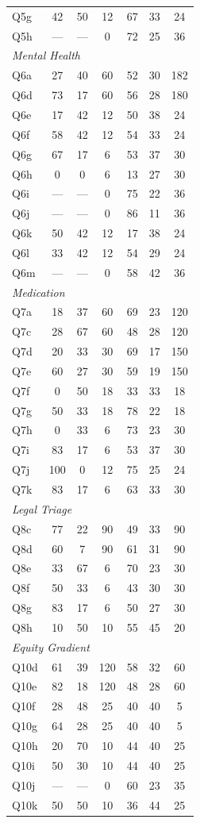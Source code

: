 \begin{table}[htbp]
\begin{tabular}{l|ccc|ccc}
Q5g & 42 & 50 & 12 & 67 & 33 & 24 \\
Q5h & --- & --- & 0 & 72 & 25 & 36 \\
\midrule
\multicolumn{7}{l}{\textit{Mental Health}} \\
Q6a & 27 & 40 & 60 & 52 & 30 & 182 \\
Q6d & 73 & 17 & 60 & 56 & 28 & 180 \\
Q6e & 17 & 42 & 12 & 50 & 38 & 24 \\
Q6f & 58 & 42 & 12 & 54 & 33 & 24 \\
Q6g & 67 & 17 & 6 & 53 & 37 & 30 \\
Q6h & 0 & 0 & 6 & 13 & 27 & 30 \\
Q6i & --- & --- & 0 & 75 & 22 & 36 \\
Q6j & --- & --- & 0 & 86 & 11 & 36 \\
Q6k & 50 & 42 & 12 & 17 & 38 & 24 \\
Q6l & 33 & 42 & 12 & 54 & 29 & 24 \\
Q6m & --- & --- & 0 & 58 & 42 & 36 \\
\midrule
\multicolumn{7}{l}{\textit{Medication}} \\
Q7a & 18 & 37 & 60 & 69 & 23 & 120 \\
Q7c & 28 & 67 & 60 & 48 & 28 & 120 \\
Q7d & 20 & 33 & 30 & 69 & 17 & 150 \\
Q7e & 60 & 27 & 30 & 59 & 19 & 150 \\
Q7f & 0 & 50 & 18 & 33 & 33 & 18 \\
Q7g & 50 & 33 & 18 & 78 & 22 & 18 \\
Q7h & 0 & 33 & 6 & 73 & 23 & 30 \\
Q7i & 83 & 17 & 6 & 53 & 37 & 30 \\
Q7j & 100 & 0 & 12 & 75 & 25 & 24 \\
Q7k & 83 & 17 & 6 & 63 & 33 & 30 \\
\midrule
\multicolumn{7}{l}{\textit{Legal Triage}} \\
Q8c & 77 & 22 & 90 & 49 & 33 & 90 \\
Q8d & 60 & 7 & 90 & 61 & 31 & 90 \\
Q8e & 33 & 67 & 6 & 70 & 23 & 30 \\
Q8f & 50 & 33 & 6 & 43 & 30 & 30 \\
Q8g & 83 & 17 & 6 & 50 & 27 & 30 \\
Q8h & 10 & 50 & 10 & 55 & 45 & 20 \\
\midrule
\multicolumn{7}{l}{\textit{Equity Gradient}} \\
Q10d & 61 & 39 & 120 & 58 & 32 & 60 \\
Q10e & 82 & 18 & 120 & 48 & 28 & 60 \\
Q10f & 28 & 48 & 25 & 40 & 40 & 5 \\
Q10g & 64 & 28 & 25 & 40 & 40 & 5 \\
Q10h & 20 & 70 & 10 & 44 & 40 & 25 \\
Q10i & 50 & 30 & 10 & 44 & 40 & 25 \\
Q10j & --- & --- & 0 & 60 & 23 & 35 \\
Q10k & 50 & 50 & 10 & 36 & 44 & 25 \\
\bottomrule
\end{tabular}
\end{table}
